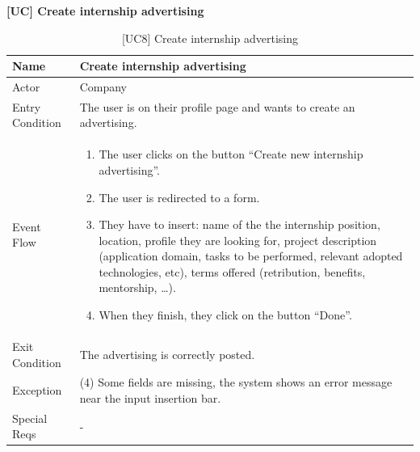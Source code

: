 \textbf{[UC\nextUseCases] Create internship advertising}
\begin{table}[H] %
    \centering
    \begin{tabular}{|p{3cm}|p{10cm}|}
    \hline
    Name & Create internship advertising \\ \hline
    Actor  & Company \\ \hline
    Entry Condition  & The user is on their profile page and wants to create an advertising. \\ \hline
    Event Flow  & 
    \begin{enumerate}[noitemsep, topsep=0pt]
        \item The user clicks on the button “Create new internship advertising”.
        \item The user is redirected to a form.
        \item They have to insert: name of the the internship position, location, profile they are looking for, project description (application domain, tasks to be performed, relevant adopted technologies, etc), terms offered (retribution, benefits, mentorship, …). 
        \item When they finish, they click on the button “Done”.
    \end{enumerate}
    \\ \hline
    Exit Condition  & The advertising is correctly posted. \\ \hline
    Exception  & (4) Some fields are missing, the system shows an error message near the input insertion bar. \\ \hline
    Special Reqs  & - \\ \hline
    \end{tabular}
    \caption{[UC8] Create internship advertising}
\end{table}

